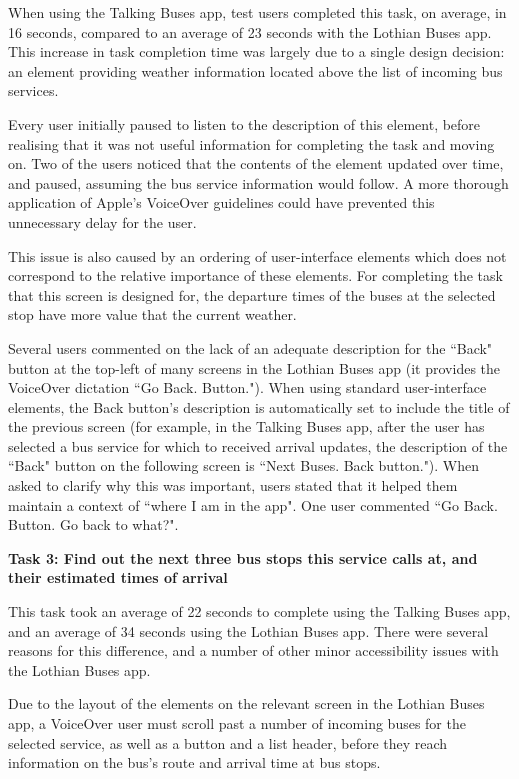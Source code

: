 \documentclass[10pt,twocolumn]{article}
\begin{document}
When using the Talking Buses app, test users completed this task, on average, in 16 seconds, compared to an average of 23 seconds with the Lothian Buses app. This increase in task completion time was largely due to a single design decision: an element providing weather information located above the list of incoming bus services.

Every user initially paused to listen to the description of this element, before realising that it was not useful information for completing the task and moving on. Two of the users noticed that the contents of the element updated over time, and paused, assuming the bus service information would follow. A more thorough application of Apple's VoiceOver guidelines could have prevented this unnecessary delay for the user.

This issue is also caused by an ordering of user-interface elements which does not correspond to the relative importance of these elements. For completing the task that this screen is designed for, the departure times of the buses at the selected stop have more value that the current weather.

Several users commented on the lack of an adequate description for the ``Back" button at the top-left of many screens in the Lothian Buses app (it provides the VoiceOver dictation ``Go Back. Button."). When using standard user-interface elements, the Back button's description is automatically set to include the title of the previous screen (for example, in the Talking Buses app, after the user has selected a bus service for which to received arrival updates, the description of the ``Back" button on the following screen is ``Next Buses. Back button."). When asked to clarify why this was important, users stated that it helped them maintain a context of ``where I am in the app". One user commented ``Go Back. Button. Go back to what?".


\textbf{Task 3: Find out the next three bus stops this service calls at, and their estimated times of arrival}

This task took an average of 22 seconds to complete using the Talking Buses app, and an average of 34 seconds using the Lothian Buses app. There were several reasons for this difference, and a number of other minor accessibility issues with the Lothian Buses app.

Due to the layout of the elements on the relevant screen in the Lothian Buses app, a VoiceOver user must scroll past a number of incoming buses for the selected service, as well as a button and a list header, before they reach information on the bus's route and arrival time at bus stops.
\end{document}
